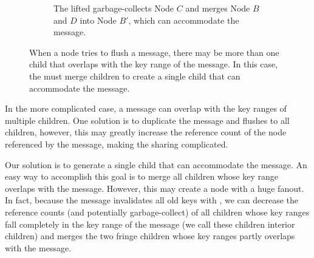 \begin{figure}
\begin{subfigure}{\textwidth}
        \caption{\label{subfig:flush-2} The lifted \bedag garbage-collects Node
            $C$ and merges Node $B$ and $D$ into Node $B'$,
            which can accommodate the \goto message.}
    \end{subfigure}
    \caption[The \bedag merges children before flushing a \goto message]{\label{fig:flush}
        When a node tries to flush a \goto message, there may be more than
        one child that overlaps with the key range of the \goto message.
        In this case, the \bedag must merge children to create a single child
        that can accommodate the \goto message.}
\end{figure}

In the more complicated case, a \goto message can overlap with the key ranges
of multiple children.
One solution is to duplicate the \goto message and flushes to all children,
however, this may greatly increase the reference count of the node referenced
by the \goto message,
making the sharing complicated.

Our solution is to generate a single child that can accommodate the \goto
message.
An easy way to accomplish this goal is to merge all children whose key range
overlaps with the \goto message.
However, this may create a node with a huge fanout.
In fact, because the \goto message invalidates all old keys
with \dpre, we can decrease the reference counts
(and potentially garbage-collect)
of all children whose key ranges fall completely in the key range of the \goto
message (we call these children interior children)
and merges the two fringe children whose key ranges partly overlaps with the
\goto message.

